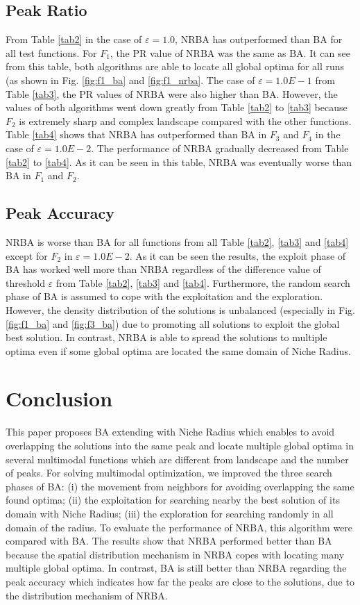 \documentclass[conference]{IEEEtran}
\begin{document}
\subsection{Peak Ratio}
From Table \ref{tab2} in the case of $\varepsilon = 1.0$, NRBA has outperformed than BA for all test functions. For $F_1$, the PR value of NRBA was the same as BA. It can see from this table, both algorithms are able to locate all global optima for all runs (as shown in Fig. \ref{fig:f1_ba} and \ref{fig:f1_nrba}. The case of $\varepsilon=1.0E-1$ from Table \ref{tab3}, the PR values of NRBA were also higher than BA. However, the values of both algorithms went down greatly from Table \ref{tab2} to \ref{tab3} because $F_2$ is extremely sharp and complex landscape compared with the other functions. Table \ref{tab4} shows that NRBA has outperformed than BA in $F_3$ and $F_4$ in the case of $\varepsilon = 1.0E-2$. The performance of NRBA gradually decreased from Table \ref{tab2} to \ref{tab4}. As it can be seen in this table, NRBA was eventually worse than BA in $F_1$ and $F_2$. 

\subsection{Peak Accuracy}
NRBA is worse than BA for all functions from all Table \ref{tab2}, \ref{tab3} and \ref{tab4} except for $F_2$ in $\varepsilon=1.0E-2$. As it can be seen the results, the exploit phase of BA has worked well more than NRBA regardless of the difference value of threshold $\varepsilon$ from Table \ref{tab2}, \ref{tab3} and \ref{tab4}. Furthermore, the random search phase of BA is assumed to cope with the exploitation and the exploration. However, the density distribution of the solutions is unbalanced (especially in Fig. \ref{fig:f1_ba} and \ref{fig:f3_ba}) due to promoting all solutions to exploit the global best solution. In contrast, NRBA is able to spread the solutions to multiple optima even if some global optima are located the same domain of Niche Radius.

\section{Conclusion}
This paper proposes BA extending with Niche Radius which enables to avoid overlapping the solutions into the same peak and locate multiple global optima in several multimodal functions which are different from landscape and the number of peaks. For solving multimodal optimization, we improved the three search phases of BA: (i) the movement from neighbors for avoiding overlapping the same found optima; (ii) the exploitation for searching nearby the best solution of its domain with Niche Radius; (iii) the exploration for searching randomly in all domain of the radius. To evaluate the performance of NRBA, this algorithm were compared with BA. The results show that NRBA performed better than BA because the spatial distribution mechanism in NRBA copes with locating many multiple global optima. In contrast, BA is still better than NRBA regarding the peak accuracy which indicates how far the peaks are close to the solutions, due to the distribution mechanism of NRBA.
\end{document}
